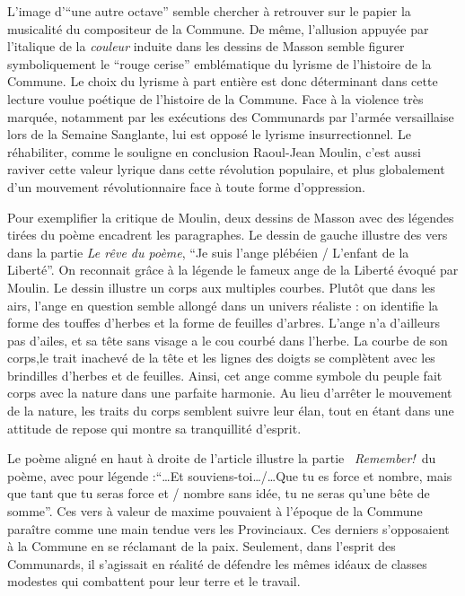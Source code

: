 L’image d'\enquote{une autre octave} semble chercher à retrouver sur le papier la musicalité du compositeur de la Commune. De même, l’allusion appuyée par l’italique de la \emph{couleur} induite dans les dessins de Masson semble figurer symboliquement le \enquote{rouge cerise} emblématique du lyrisme de l’histoire de la Commune. Le choix du lyrisme à part entière est donc déterminant dans cette lecture voulue poétique de l’histoire de la Commune. Face à la violence très marquée, notamment par les exécutions des Communards par l’armée versaillaise lors de la Semaine Sanglante, lui est opposé le lyrisme insurrectionnel. Le réhabiliter, comme le souligne en conclusion Raoul-Jean Moulin, c’est aussi raviver cette valeur lyrique dans cette révolution populaire, et plus globalement d’un mouvement révolutionnaire face à toute forme d’oppression. 

Pour exemplifier la critique de Moulin, deux dessins de Masson avec des légendes tirées du poème encadrent les paragraphes.  Le dessin de gauche illustre des vers dans la partie \emph{Le rêve du poème}, \enquote{Je suis l’ange plébéien / L’enfant de la Liberté}. On reconnait grâce à la légende le fameux ange de la Liberté évoqué par Moulin. Le dessin illustre un corps aux multiples courbes. Plutôt que dans les airs, l’ange en question semble allongé dans un univers réaliste : on identifie la forme des touffes d’herbes et la forme de feuilles d’arbres. L’ange n’a d’ailleurs pas d’ailes, et sa tête sans visage a le cou courbé dans l’herbe. La courbe de son corps,le trait inachevé de la tête et les lignes des doigts se complètent avec les brindilles d’herbes et de feuilles. Ainsi, cet ange comme symbole du peuple fait corps avec la nature dans une parfaite harmonie. Au lieu d’arrêter le mouvement de la nature, les traits du corps semblent suivre leur élan, tout en étant dans une attitude de repose qui montre sa tranquillité d’esprit.


Le poème aligné en haut à droite de l’article illustre la partie  \emph{Remember!} du poème, avec pour légende :\enquote{…Et souviens-toi…/…Que tu es force et nombre, mais que tant que tu seras force et / nombre sans idée, tu ne seras qu’une bête de somme}. Ces vers à valeur de maxime pouvaient à l’époque de la Commune paraître comme une main tendue vers les Provinciaux. Ces derniers s’opposaient à la Commune en se réclamant de la paix. Seulement, dans l’esprit des Communards, il s’agissait en réalité de défendre les mêmes idéaux de classes modestes qui combattent pour leur terre et le travail.

